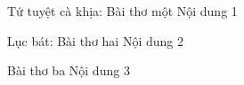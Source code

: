 \documentclass{article}
\begin{document}
\tableofcontents

\begin{tutuyetbox}{Tứ tuyệt cà khịa: Bài thơ một}
Nội dung 1
\end{tutuyetbox}

\begin{tutuyetbox}{Lục bát: Bài thơ hai}
Nội dung 2
\end{tutuyetbox}

\begin{tutuyetbox}{Bài thơ ba}
Nội dung 3
\end{tutuyetbox}
\end{document}
